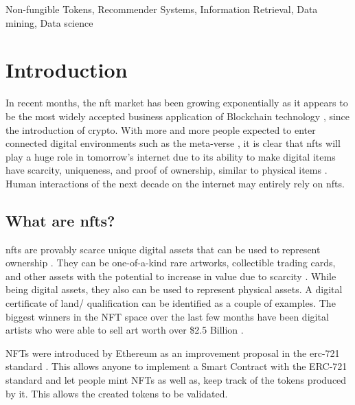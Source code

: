 \documentclass[conference]{IEEEtran}
\begin{document}
\begin{IEEEkeywords}
Non-fungible Tokens, Recommender Systems, Information Retrieval, Data mining, Data science
\end{IEEEkeywords}

\section{Introduction}
In recent months, the \Gls{nft} market has been growing exponentially as it appears to be the most widely accepted business application of Blockchain technology \autocite{dowling_is_2021}, since the introduction of crypto. With more and more people expected to enter connected digital environments such as the meta-verse \autocite{casey_newton_mark_2021}, it is clear that \gls{nft}s will play a huge role in tomorrow's internet \autocite{peter_allen_clark_what_2021} due to its ability to make digital items have scarcity, uniqueness, and proof of ownership, similar to physical items \autocite{noauthor_non-fungible_nodate}. Human interactions of the next decade on the internet may entirely rely on \gls{nft}s.

\subsection{What are \gls{nft}s?}
\Gls{nft}s are provably scarce unique digital assets that can be used to represent ownership \autocite{noauthor_erc-721_nodate}.
They can be one-of-a-kind rare artworks, collectible trading cards, and other assets with the potential to increase in value due to scarcity \autocite{conti_what_2021, fairfield_tokenized_2021}. While being digital assets, they also can be used to represent physical assets. A digital certificate of land/ qualification can be identified as a couple of examples. The biggest winners in the NFT space over the last few months have been digital artists who were able to sell art worth over \$2.5 Billion \autocite{noauthor_off_2021}.

NFTs were introduced by Ethereum \autocite{wood_ethereum_2014} as an improvement proposal \autocite{noauthor_eip-2309_nodate, noauthor_erc_nodate} in the \gls{erc}-721 standard \autocite{noauthor_erc-721_nodate}. This allows anyone to implement a Smart Contract with the ERC-721 standard and let people mint NFTs as well as, keep track of the tokens produced by it. This allows the created tokens to be validated.

\end{document}
